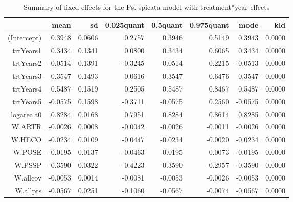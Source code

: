 \begin{table}[ht]
\centering
\caption{Summary of fixed effects for the Ps. spicata model with treatment*year effects} 
\label{PSSPgrowth-trtYears}
\begin{tabular}{rrrrrrrr}
  \hline
 & mean & sd & 0.025quant & 0.5quant & 0.975quant & mode & kld \\ 
  \hline
(Intercept) & 0.3948 & 0.0606 & 0.2757 & 0.3946 & 0.5149 & 0.3943 & 0.0000 \\ 
  trtYears1 & 0.3434 & 0.1341 & 0.0800 & 0.3434 & 0.6065 & 0.3434 & 0.0000 \\ 
  trtYears2 & -0.0514 & 0.1391 & -0.3245 & -0.0514 & 0.2215 & -0.0513 & 0.0000 \\ 
  trtYears3 & 0.3547 & 0.1493 & 0.0616 & 0.3547 & 0.6476 & 0.3547 & 0.0000 \\ 
  trtYears4 & 0.5487 & 0.1519 & 0.2505 & 0.5487 & 0.8467 & 0.5487 & 0.0000 \\ 
  trtYears5 & -0.0575 & 0.1598 & -0.3711 & -0.0575 & 0.2560 & -0.0575 & 0.0000 \\ 
  logarea.t0 & 0.8284 & 0.0168 & 0.7951 & 0.8284 & 0.8614 & 0.8285 & 0.0000 \\ 
  W.ARTR & -0.0026 & 0.0008 & -0.0042 & -0.0026 & -0.0011 & -0.0026 & 0.0000 \\ 
  W.HECO & -0.0234 & 0.0109 & -0.0447 & -0.0234 & -0.0020 & -0.0234 & 0.0000 \\ 
  W.POSE & -0.0195 & 0.0137 & -0.0463 & -0.0195 & 0.0073 & -0.0195 & 0.0000 \\ 
  W.PSSP & -0.3590 & 0.0322 & -0.4223 & -0.3590 & -0.2957 & -0.3590 & 0.0000 \\ 
  W.allcov & -0.0053 & 0.0014 & -0.0081 & -0.0053 & -0.0026 & -0.0053 & 0.0000 \\ 
  W.allpts & -0.0567 & 0.0251 & -0.1060 & -0.0567 & -0.0074 & -0.0567 & 0.0000 \\ 
   \hline
\end{tabular}
\end{table}
